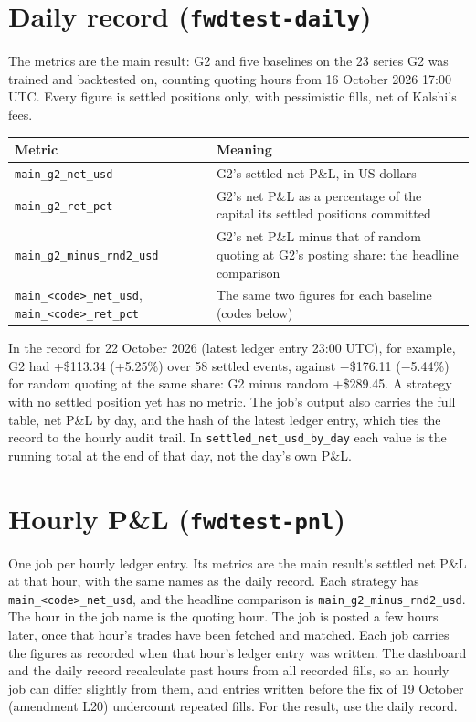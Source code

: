 \documentclass[11pt,a4paper]{article}
\newcommand{\job}[1]{\texttt{#1}}
\begin{document}
\section*{Daily record (\job{fwdtest-daily})}

The metrics are the main result: G2 and five baselines on the 23 series G2 was trained and backtested on, counting
quoting hours from 16 October 2026 17:00 UTC. Every figure is settled positions only, with pessimistic fills, net of
Kalshi's fees.

\begin{tabularx}{\textwidth}{@{}P{5.6cm} L@{}}
\toprule
Metric & Meaning \\
\midrule
\job{main\_g2\_net\_usd} & G2's settled net P\&L, in US dollars \\
\job{main\_g2\_ret\_pct} & G2's net P\&L as a percentage of the capital its settled positions committed \\
\job{main\_g2\_minus\_rnd2\_usd} & G2's net P\&L minus that of random quoting at G2's posting share: the headline
  comparison \\
\job{main\_<code>\_net\_usd}, \job{main\_<code>\_ret\_pct} & The same two figures for each baseline (codes below) \\
\bottomrule
\end{tabularx}

In the record for 22 October 2026 (latest ledger entry 23:00 UTC), for example, G2 had +\$113.34 (+5.25\%) over 58 settled events, against
$-$\$176.11 ($-$5.44\%) for random quoting at the same share: G2 minus random +\$289.45. A strategy with no settled
position yet has no metric. The job's output also carries the full table, net P\&L by day, and the hash of the
latest ledger entry, which ties the record to the hourly audit trail. In \job{settled\_net\_usd\_by\_day} each value
is the running total at the end of that day, not the day's own P\&L.

\section*{Hourly P\&L (\job{fwdtest-pnl})}

One job per hourly ledger entry. Its metrics are the main result's settled net P\&L at that hour, with the same names
as the daily record. Each strategy has \job{main\_<code>\_net\_usd}, and the headline comparison is
\job{main\_g2\_minus\_rnd2\_usd}. The hour in
the job name is the quoting hour. The job is posted a few hours later, once that hour's trades have been fetched and
matched. Each job carries the figures as recorded when that hour's ledger entry was written. The dashboard and the
daily record recalculate past hours from all recorded fills, so an hourly job can differ slightly from them, and
entries written before the fix of 19 October (amendment L20) undercount repeated fills. For the result, use the daily
record.
\end{document}
